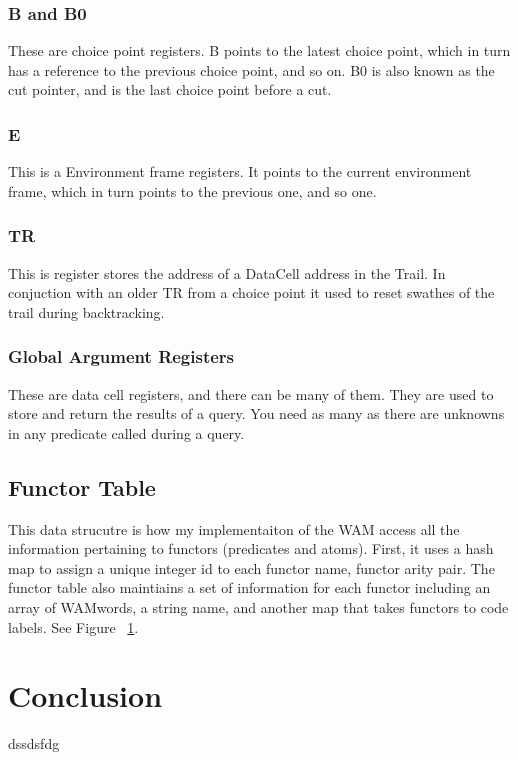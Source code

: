 \documentclass{article}
\begin{document}
\subsubsection{B and B0}
These are choice point registers. B points to the latest choice point, which in turn has a reference to the previous choice point, and so on. B0 is also known as the cut pointer, and is the last choice point before a cut. 

\subsubsection{E}
This is a Environment frame registers. It points to the current environment frame, which in turn points to the previous one, and so one. 

\subsubsection{TR}
This is register stores the address of a  DataCell address in the Trail. In conjuction with an older TR from a choice point it used to reset swathes of the trail during backtracking. 

\subsubsection{Global Argument Registers}
These are data cell registers, and there can be many of them. They are used to store and return the results of a query. You need as many as there are unknowns in any predicate called during a query. 

\subsection{Functor Table}
This data strucutre is how my implementaiton of the WAM access all the information pertaining to functors (predicates and atoms). First, it uses a hash map to assign a unique integer id to each functor name, functor arity pair. The functor table also maintiains a set of information for each functor including an array of WAMwords, a string name, and another map that takes functors to code labels. See Figure ~\ref{}.

\section{Conclusion}
dssdsfdg
\end{document}
